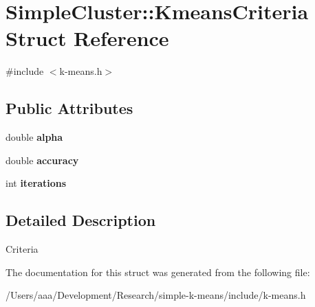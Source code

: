 \hypertarget{structSimpleCluster_1_1KmeansCriteria}{\section{Simple\+Cluster\+:\+:Kmeans\+Criteria Struct Reference}
\label{structSimpleCluster_1_1KmeansCriteria}
}


{\ttfamily \#include $<$k-\/means.\+h$>$}

\subsection*{Public Attributes}
\begin{DoxyCompactItemize}
\item 
\hypertarget{structSimpleCluster_1_1KmeansCriteria_a90eb14d83eaaa78c6aa590cc03db151a}{double {\bfseries alpha}}\label{structSimpleCluster_1_1KmeansCriteria_a90eb14d83eaaa78c6aa590cc03db151a}

\item 
\hypertarget{structSimpleCluster_1_1KmeansCriteria_a417746caabd9c8aa94eae201ebe706ff}{double {\bfseries accuracy}}\label{structSimpleCluster_1_1KmeansCriteria_a417746caabd9c8aa94eae201ebe706ff}

\item 
\hypertarget{structSimpleCluster_1_1KmeansCriteria_a315f994501adf69d674ff6ab57291f91}{int {\bfseries iterations}}\label{structSimpleCluster_1_1KmeansCriteria_a315f994501adf69d674ff6ab57291f91}

\end{DoxyCompactItemize}


\subsection{Detailed Description}
Criteria 

The documentation for this struct was generated from the following file\+:\begin{DoxyCompactItemize}
\item 
/\+Users/aaa/\+Development/\+Research/simple-\/k-\/means/include/k-\/means.\+h\end{DoxyCompactItemize}
